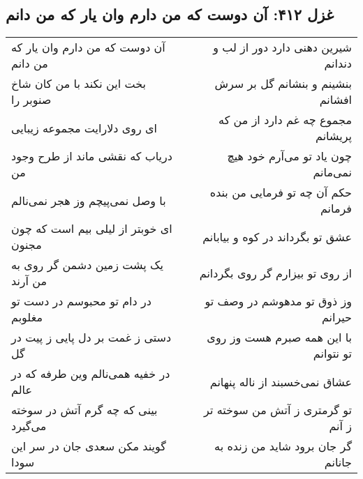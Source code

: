 \begin{center}
\section*{غزل ۴۱۲: آن دوست که من دارم وان یار که من دانم}
\label{sec:412}
\begin{longtable}{l p{0.5cm} r}
آن دوست که من دارم وان یار که من دانم
&&
شیرین دهنی دارد دور از لب و دندانم
\\
بخت این نکند با من کان شاخ صنوبر را
&&
بنشینم و بنشانم گل بر سرش افشانم
\\
ای روی دلارایت مجموعه زیبایی
&&
مجموع چه غم دارد از من که پریشانم
\\
دریاب که نقشی ماند از طرح وجود من
&&
چون یاد تو می‌آرم خود هیچ نمی‌مانم
\\
با وصل نمی‌پیچم وز هجر نمی‌نالم
&&
حکم آن چه تو فرمایی من بنده فرمانم
\\
ای خوبتر از لیلی بیم است که چون مجنون
&&
عشق تو بگرداند در کوه و بیابانم
\\
یک پشت زمین دشمن گر روی به من آرند
&&
از روی تو بیزارم گر روی بگردانم
\\
در دام تو محبوسم در دست تو مغلوبم
&&
وز ذوق تو مدهوشم در وصف تو حیرانم
\\
دستی ز غمت بر دل پایی ز پیت در گل
&&
با این همه صبرم هست وز روی تو نتوانم
\\
در خفیه همی‌نالم وین طرفه که در عالم
&&
عشاق نمی‌خسبند از ناله پنهانم
\\
بینی که چه گرم آتش در سوخته می‌گیرد
&&
تو گرمتری ز آتش من سوخته تر ز آنم
\\
گویند مکن سعدی جان در سر این سودا
&&
گر جان برود شاید من زنده به جانانم
\\
\end{longtable}
\end{center}
